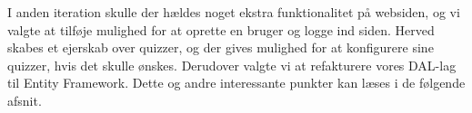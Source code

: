 I anden iteration skulle der hældes noget ekstra funktionalitet på websiden, og vi valgte at tilføje mulighed for at oprette en bruger og logge ind siden. Herved skabes et ejerskab over quizzer, og der gives mulighed for at konfigurere sine quizzer, hvis det skulle ønskes. Derudover valgte vi at refakturere vores DAL-lag til Entity Framework. Dette og andre interessante punkter kan læses i de følgende afsnit.













